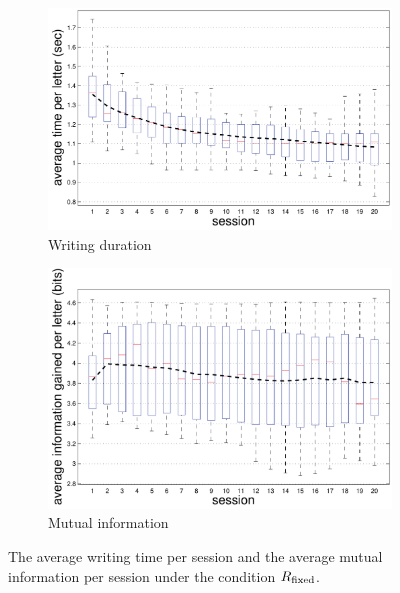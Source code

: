 \documentclass{sigchi}
\begin{document}
\begin{figure}[!t]
  \centering
  \begin{subfigure}[b]{\columnwidth}
    \includegraphics[width=\columnwidth]{figures/IUI_duration_p_adapt.pdf}
    \caption{Writing duration}
    \label{fig:duration}
  \end{subfigure}
  \begin{subfigure}[b]{\columnwidth}
    \includegraphics[width=\columnwidth]{figures/IUI_total_logloss_p_first.pdf}
    \caption{Mutual information}
    \label{fig:mutual_information}
  \end{subfigure}
  \caption{The average writing time per session and the average mutual
    information per session under the condition $R_{\mathrm{fixed}}$.}
\end{figure}
\end{document}
